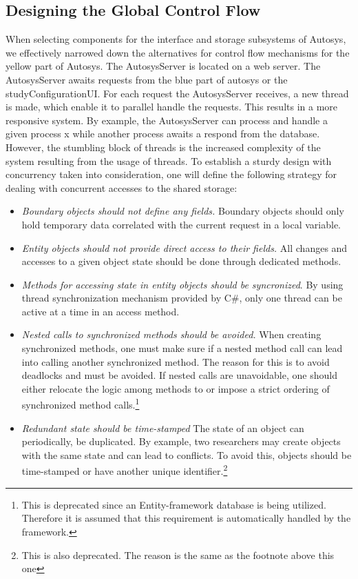 \subsection{Designing the Global Control Flow}
When selecting components for the interface and storage subsystems of Autosys, we effectively narrowed down the alternatives for control flow mechanisms for the yellow part of Autosys. The AutosysServer is located on a web server. The AutosysServer awaits requests from the blue part of autosys or the studyConfigurationUI. For each request the AutosysServer receives, a new thread is made, which enable it to parallel handle the requests. This results in a more responsive system. By example, the AutosysServer can process and handle a given process x while another process awaits a respond from the database. However, the stumbling block of threads is the increased complexity of the system resulting from the usage of threads. To establish a sturdy design with concurrency taken into consideration, one will define the following strategy for dealing with concurrent accesses to the shared storage:
\begin{itemize}
	\item \textit{Boundary objects should not define any fields.} Boundary objects should only hold temporary data correlated with the current request in a local variable.
	\item \textit{Entity objects should not provide direct access to their fields.} All changes and accesses to a given object state should be done through dedicated methods. 
	\item \textit{Methods for accessing state in entity objects should be syncronized}. By using thread synchronization mechanism provided by C\#, only one thread can be active at a time in an access method.
	\item \textit{Nested calls to synchronized methods should be avoided.} When creating synchronized methods, one must make sure if a nested method call can lead into calling another synchronized method. The reason for this is to avoid deadlocks and must be avoided. If nested calls are unavoidable, one should either relocate the logic among methods to or impose a strict ordering of synchronized method calls.\footnote{This is deprecated since an Entity-framework database is being utilized. Therefore it is assumed that this requirement is automatically handled by the framework.}\label{nestedcallsglobalflow}
	\item \textit{Redundant state should be time-stamped} The state of an object can periodically, be duplicated. By example, two researchers may create objects with the same state and can lead to conflicts. To avoid this, objects should be time-stamped or have another unique identifier.\footnote{This is also deprecated. The reason is the same as the footnote above this one }

\end{itemize}